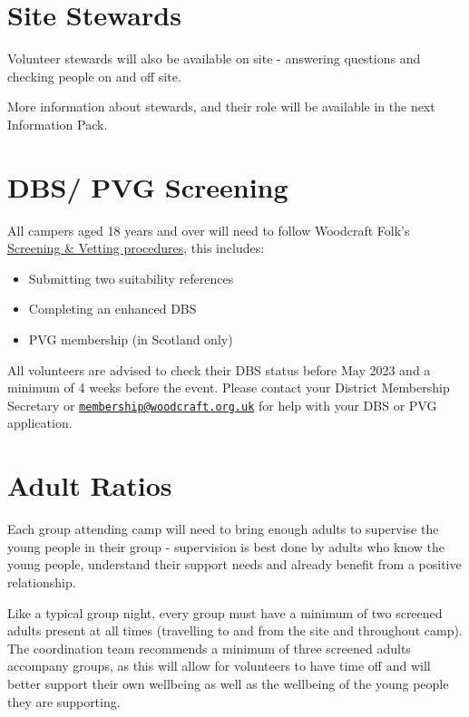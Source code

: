 \documentclass[a4paper, 11pt]{report}
\newcommand{\nl}{\newline}
\begin{document}
\section{Site Stewards}
Volunteer stewards will also be available on site - answering questions and checking people on and off site.\nl

More information about stewards, and their role will be available in the next Information Pack.

\section{DBS/ PVG Screening}
All campers aged 18 years and over will need to follow Woodcraft Folk's \href{https://woodcraft.org.uk/resources/volunteer-screening/}{Screening \& Vetting procedures}, this includes: 
\begin{itemize}
    \item Submitting two suitability references
    \item Completing an enhanced DBS 
    \item PVG membership (in Scotland only) 
\end{itemize}
All volunteers are advised to check their DBS status before May 2023 and a minimum of 4 weeks before the event. Please contact your District Membership Secretary or \href{mailto:membership@woodcraft.org.uk}{\texttt{membership@woodcraft.org.uk}} for help with your DBS or PVG application.

\section{Adult Ratios}
Each group attending camp will need to bring enough adults to supervise the young people in their group - supervision is best done by adults who know the young people, understand their support needs and already benefit from a positive relationship.\nl

Like a typical group night, every group must have a minimum of two screened adults present at all times (travelling to and from the site and throughout camp). The coordination team recommends a minimum of three screened adults accompany groups, as this will allow for volunteers to have time off and will better support their own wellbeing as well as the wellbeing of the young people they are supporting.\nl
\end{document}
